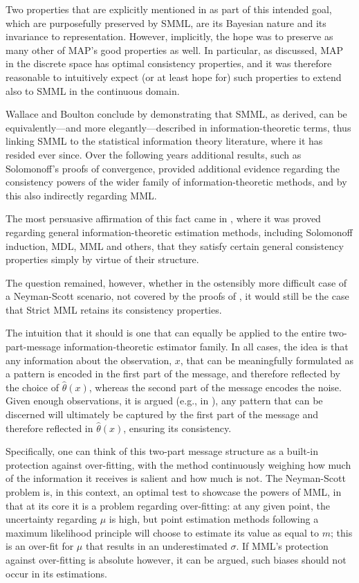 \documentclass{IEEEtran}
\newcommand{\citet}[1]{\cite{#1}}
\newcommand{\citep}[1]{\cite{#1}}
\begin{document}
Two properties that are explicitly mentioned in \citet{wallace1975invariant}
as part of this
intended goal, which are purposefully preserved by SMML, are its Bayesian
nature and its invariance to representation.
However, implicitly, the hope was to preserve as
many other of MAP's good properties as well. In particular, as discussed, MAP
in the discrete space has optimal consistency properties, and it was therefore
reasonable to intuitively expect (or at least hope for) such properties to
extend also to SMML in the continuous domain.

Wallace and Boulton conclude \citet{wallace1975invariant}
by demonstrating that SMML, as derived, can be
equivalently---and more elegantly---described in information-theoretic
terms, thus linking SMML to the statistical information theory literature,
where it has resided ever since. Over the following years additional
results, such as Solomonoff's \citep{Solomonoff1978} proofs of convergence,
provided additional evidence regarding the consistency powers of
the wider family of information-theoretic methods, and by this also
indirectly regarding MML.

The most persuasive affirmation of this fact came in \citet{BarronCover1991},
where it was proved regarding general information-theoretic estimation methods,
including Solomonoff induction, MDL, MML and others, that they satisfy certain
general consistency properties simply by virtue of their structure.

The question remained, however, whether in the ostensibly more difficult case
of a Neyman-Scott scenario, not covered by the proofs of
\citet{BarronCover1991},
it would still be the case that Strict MML retains its consistency properties.

The intuition that it should is one that can equally be applied to the entire
two-part-message information-theoretic estimator family. In all cases, the
idea is that any information about the observation, $x$, that can be
meaningfully
formulated as a pattern is encoded in the first part of the message, and
therefore reflected by the choice of $\hat{\theta}(x)$, whereas the second
part of the message encodes the noise. Given enough observations, it is
argued (e.g., in \citet{DoweGardnerOppy2007}),
any pattern that can be discerned will ultimately
be captured by the first part of the message and therefore reflected in
$\hat{\theta}(x)$, ensuring its consistency.

Specifically, one can think of this two-part message structure as a built-in
protection against over-fitting, with the method continuously weighing how
much of the information it receives is salient and how much is not. The
Neyman-Scott problem is, in this context, an optimal test to showcase the
powers of MML, in that at its core it is a problem regarding over-fitting:
at any given point, the uncertainty regarding $\mu$ is high, but
point estimation methods following a maximum likelihood principle will
choose to estimate its value as equal to $m$; this is an over-fit for $\mu$
that results in an underestimated $\sigma$. If MML's protection against
over-fitting is absolute however, it can be argued, such biases should not
occur in its estimations.
\end{document}
